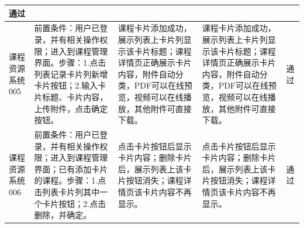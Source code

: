 \documentclass[titlepage,UTF8,linespread=1.5]{ctexart}
\begin{document}
\begin{longtable}{|p{4em}|p{14em}|p{7em}|p{7em}|p{2em}|}
    通过 \\\hline
    课程资源系统005 &
    前置条件：用户已登录，并有相关操作权限；进入到课程管理界面。步骤：1.点击列表记录卡片列新增卡片按钮；2.输入卡片标题、卡片内容，上传附件，点击确定按钮。 &
    课程卡片添加成功，展示列表上卡片列显示该卡片标题；课程详情页正确展示卡片内容，附件自动分类，PDF可以在线预览，视频可以在线播放，其他附件可直接下载。&
    课程卡片添加成功，展示列表上卡片列显示该卡片标题；课程详情页正确展示卡片内容，附件自动分类，PDF可以在线预览，视频可以在线播放，其他附件可直接下载。&
    通过 \\\hline
    课程资源系统006 &
    前置条件：用户已登录，并有相关操作权限；进入到课程管理界面；已有添加卡片的课程。步骤：1.点击列表卡片列其中一个卡片按钮；2.点击删除，并确定。 &
    点击卡片按钮后显示卡片内容；删除卡片后，展示列表上该卡片按钮消失；课程详情页该卡片内容不再显示。&
    点击卡片按钮后显示卡片内容；删除卡片后，展示列表上该卡片按钮消失；课程详情页该卡片内容不再显示。&
    通过 \\\hline

\end{longtable}
\end{document}
